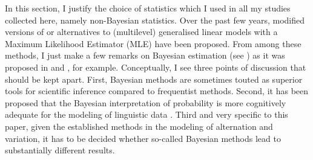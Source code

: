 In this section, I justify the choice of statistics which I used in all my studies collected here, namely non-Bayesian statistics.
Over the past few years, modified versions of or alternatives to (multilevel) generalised linear models with a Maximum Likelihood Estimator (MLE) have been proposed.
From among these methods, I just make a few remarks on Bayesian estimation (see \citealt{GelmanEa2014}) as it was proposed in \citet{Levshina2016} and \citet{Divjak2016a}, for example.
Conceptually, I see three points of discussion that should be kept apart.
First, Bayesian methods are sometimes touted as superior tools for scientific inference compared to frequentist methods.
Second, it has been proposed that the Bayesian interpretation of probability is more cognitively adequate for the modeling of linguistic data \citep[301--302]{Divjak2016a}.
Third and very specific to this paper, given the established methods in the modeling of alternation and variation, it has to be decided whether so-called Bayesian methods lead to substantially different results.

